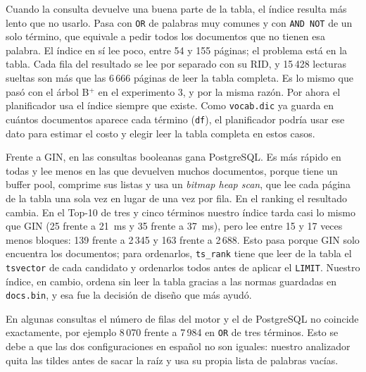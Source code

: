 Cuando la consulta devuelve una buena parte de la tabla, el índice resulta más
lento que no usarlo. Pasa con \texttt{OR} de palabras muy comunes y con
\texttt{AND NOT} de un solo término, que equivale a pedir todos los documentos
que no tienen esa palabra. El índice en sí lee poco, entre 54 y 155 páginas; el
problema está en la tabla. Cada fila del resultado se lee por separado con su
RID, y 15\,428 lecturas sueltas son más que las 6\,666 páginas de leer la tabla
completa. Es lo mismo que pasó con el árbol B$^+$ en el experimento 3, y por la
misma razón. Por ahora el planificador usa el índice siempre que existe. Como
\texttt{vocab.dic} ya guarda en cuántos documentos aparece cada término
(\texttt{df}), el planificador podría usar ese dato para estimar el costo y
elegir leer la tabla completa en estos casos.

Frente a GIN, en las consultas booleanas gana PostgreSQL. Es más rápido en todas
y lee menos en las que devuelven muchos documentos, porque tiene un buffer pool,
comprime sus listas y usa un \textit{bitmap heap scan}, que lee cada página de la
tabla una sola vez en lugar de una vez por fila. En el ranking el resultado
cambia. En el Top-10 de tres y cinco términos nuestro índice tarda casi lo mismo
que GIN (25 frente a 21~ms y 35 frente a 37~ms), pero lee entre 15 y 17 veces
menos bloques: 139 frente a 2\,345 y 163 frente a 2\,688. Esto pasa porque GIN
solo encuentra los documentos; para ordenarlos, \texttt{ts\_rank} tiene que leer
de la tabla el \texttt{tsvector} de cada candidato y ordenarlos todos antes de
aplicar el \texttt{LIMIT}. Nuestro índice, en cambio, ordena sin leer la tabla
gracias a las normas guardadas en \texttt{docs.bin}, y esa fue la decisión de
diseño que más ayudó.

En algunas consultas el número de filas del motor y el de PostgreSQL no coincide
exactamente, por ejemplo 8\,070 frente a 7\,984 en \texttt{OR} de tres términos.
Esto se debe a que las dos configuraciones en español no son iguales: nuestro
analizador quita las tildes antes de sacar la raíz y usa su propia lista de
palabras vacías.